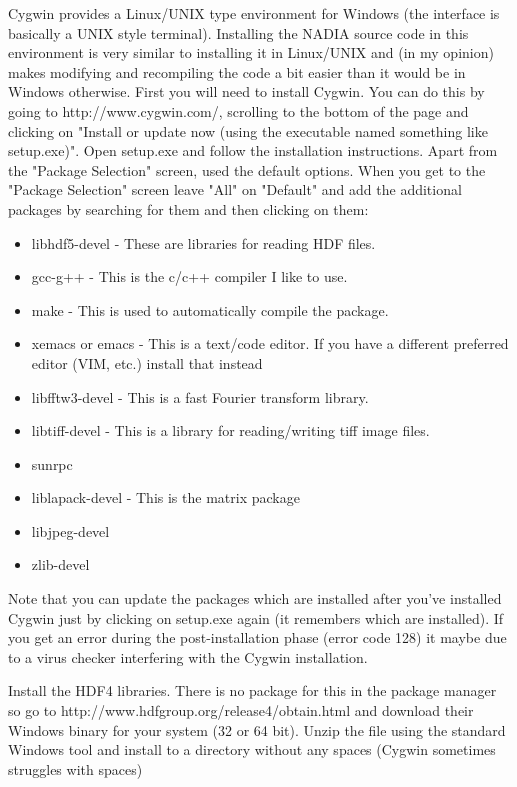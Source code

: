 \documentclass[]{nadia}
\begin{document}
Cygwin\cite{cygwin} provides a Linux/UNIX type environment for Windows (the
interface is basically a UNIX style terminal). Installing the NADIA
source code in this environment is very similar to installing it in
Linux/UNIX and (in my opinion) makes modifying and recompiling the
code a bit easier than it would be in Windows otherwise. First you
will need to install Cygwin. You can do this by going to
http://www.cygwin.com/, scrolling to the bottom of the page and
clicking on "Install or update now (using the executable named something like setup.exe)". Open setup.exe
and follow the installation instructions. Apart from the "Package
Selection" screen, used the default options. When you get to the
"Package Selection" screen leave "All" on "Default" and add the
additional packages by searching for them and then clicking on them:
\begin{itemize}
\item libhdf5-devel - These are libraries for reading HDF files.
\item gcc-g++ - This is the c/c++ compiler I like to use.
\item make - This is used to automatically compile the package.
\item xemacs or emacs - This is a text/code editor. If you have a different preferred editor (VIM, etc.) install that instead
\item libfftw3-devel - This is a fast Fourier transform library.
\item libtiff-devel - This is a library for reading/writing tiff image files.
\item sunrpc
\item liblapack-devel - This is the matrix package
\item libjpeg-devel
\item zlib-devel
\end{itemize}

Note that you can update the packages which are installed after you've
installed Cygwin just by clicking on setup.exe again (it remembers
which are installed). If you get an error during the post-installation
phase (error code 128) it maybe due to a virus checker interfering
with the Cygwin installation.

Install the HDF4 libraries. There is no package for this in the
package manager so go to http://www.hdfgroup.org/release4/obtain.html
and download their Windows binary for your system (32 or 64 bit). 
Unzip the file using the standard Windows tool and install to a directory 
without any spaces (Cygwin sometimes struggles with spaces)
\end{document}

